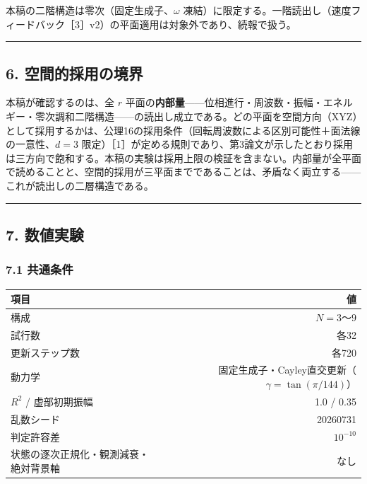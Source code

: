\documentclass[
  a4paper,
]{ltjsarticle}
\newcounter{none} %
\begin{document}
本稿の二階構造は零次（固定生成子、\(\omega\)
凍結）に限定する。一階読出し（速度フィードバック［3］v2）の平面適用は対象外であり、続報で扱う。

\begin{center}\rule{0.5\linewidth}{0.5pt}\end{center}

\subsection{6.
空間的採用の境界}\label{ux7a7aux9593ux7684ux63a1ux7528ux306eux5883ux754c}

本稿が確認するのは、全 \(r\)
平面の\textbf{内部量}------位相進行・周波数・振幅・エネルギー・零次調和二階構造------の読出し成立である。どの平面を空間方向（XYZ）として採用するかは、公理16の採用条件（回転周波数による区別可能性＋面法線の一意性、\(d=3\)
限定）［1］が定める規則であり、第3論文が示したとおり採用は三方向で飽和する。本稿の実験は採用上限の検証を含まない。内部量が全平面で読めることと、空間的採用が三平面までであることは、矛盾なく両立する------これが読出しの二層構造である。

\begin{center}\rule{0.5\linewidth}{0.5pt}\end{center}

\subsection{7. 数値実験}\label{ux6570ux5024ux5b9fux9a13}

\subsubsection{7.1 共通条件}\label{ux5171ux901aux6761ux4ef6}

{\def\LTcaptype{none} %
\begin{longtable}[]{@{}lr@{}}
\toprule\noalign{}
項目 & 値 \\
\midrule\noalign{}
\endhead
\bottomrule\noalign{}
\endlastfoot
構成 & \(N=3\)〜\(9\) \\
試行数 & 各32 \\
更新ステップ数 & 各720 \\
動力学 & 固定生成子・Cayley直交更新（\(\gamma=\tan(\pi/144)\)） \\
\(R^2\) / 虚部初期振幅 & 1.0 / 0.35 \\
乱数シード & 20260731 \\
判定許容差 & \(10^{-10}\) \\
状態の逐次正規化・観測減衰・絶対背景軸 & なし \\
\end{longtable}
}
\end{document}
